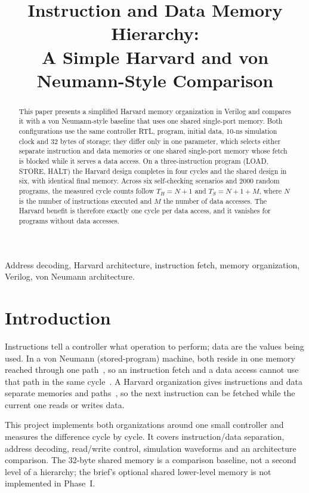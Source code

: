 \documentclass[conference,a4paper]{IEEEtran}
\title{Instruction and Data Memory Hierarchy:\\A Simple Harvard and von Neumann-Style Comparison}
\author{\IEEEauthorblockN{Akshat Chauhan, Ajeesh Amreet, Vaibhav,\\
Hardik Maheshwari and Mitul Bhatia}
\IEEEauthorblockA{Team HEXARCH, Section A --- MCA Project 9, 2026\\
Newton School of Technology, Rishihood University\\
mitul.bhatia2024@nst.rishihood.edu.in}}
\begin{document}
\maketitle

\begin{abstract}
This paper presents a simplified Harvard memory organization in Verilog and
compares it with a von Neumann-style baseline that uses one shared
single-port memory. Both configurations use the same controller RTL,
program, initial data, 10-ns simulation clock and 32 bytes of storage;
they differ only in one parameter, which selects either separate
instruction and data memories or one shared single-port memory whose
fetch is blocked while it serves a data access. On a three-instruction program
(LOAD, STORE, HALT) the Harvard design completes in four cycles and the
shared design in six, with identical final memory. Across six
self-checking scenarios and 2000 random programs, the measured cycle
counts follow $T_H=N+1$ and $T_S=N+1+M$, where $N$ is the number of
instructions executed and $M$ the number of data accesses. The Harvard
benefit is therefore exactly one cycle per data access, and it vanishes
for programs without data accesses.
\end{abstract}

\begin{IEEEkeywords}
Address decoding, Harvard architecture, instruction fetch, memory
organization, Verilog, von Neumann architecture.
\end{IEEEkeywords}

\section{Introduction}
Instructions tell a controller what operation to perform; data are the
values being used. In a von Neumann (stored-program) machine, both reside
in one memory reached through one path~\cite{vonneumann}, so an
instruction fetch and a data access cannot use that path in the same
cycle~\cite{backus}. A Harvard organization gives instructions and data
separate memories and paths~\cite{aiken}, so the next instruction can be
fetched while the current one reads or writes data.

This project implements both organizations around one small controller
and measures the difference cycle by cycle. It covers instruction/data
separation, address decoding, read/write control, simulation waveforms and
an architecture comparison. The 32-byte shared memory is a comparison
baseline, not a second level of a hierarchy; the brief's optional shared
lower-level memory is not implemented in Phase~I.
\end{document}
